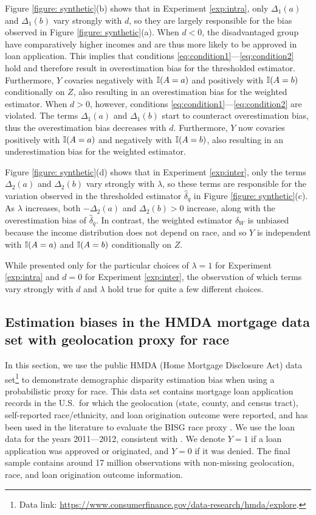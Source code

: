 Figure \ref{figure: synthetic}(b) shows that in Experiment \ref{exp:intra}, only $\Delta_1\!(a)$ and $\Delta_1\!(b)$ vary strongly with $d$, so they are largely responsible for the bias observed in Figure \ref{figure: synthetic}(a).
When $d < 0$, the disadvantaged group have comparatively higher incomes and are thus more likely to be approved in loan application.
This implies that conditions \eqref{eq:condition1}---\eqref{eq:condition2} hold and therefore result in overestimation bias for the thresholded estimator.
Furthermore, $Y$ covaries negatively with $\mathbb{I}(A=a)$ and positively with $\mathbb{I}(A=b)$ conditionally on $Z$, also resulting in an overestimation bias for the weighted estimator.
When $d > 0$, however, conditions \eqref{eq:condition1}---\eqref{eq:condition2} are violated.
The terms $\Delta_1(a)$ and $\Delta_1(b)$ start to counteract overestimation bias, thus the overestimation bias decreases with $d$.
Furthermore, $Y$ now covaries positively with $\mathbb{I}(A=a)$ and negatively with $\mathbb{I}(A=b)$, also resulting in an underestimation bias for the weighted estimator.

Figure \ref{figure: synthetic}(d) shows that in Experiment \ref{exp:inter}, only the terms $\Delta_2(a)$ and $\Delta_2(b)$ vary strongly with $\lambda$, so these terms are responsible for the variation observed in the thresholded estimator $\hat\delta_q$ in Figure \ref{figure: synthetic}(c).
As $\lambda$ increases, both $-\Delta_2(a)$ and $\Delta_2(b) > 0$ increase, along with the overestimation bias of $\hat\delta_q$.
In contrast, the weighted estimator $\hat\delta_W$ is unbiased because the income distribution does not depend on race, and so $Y$ is independent with $\mathbb{I}(A = a)$ and $\mathbb{I}(A=b)$ conditionally on $Z$.

While presented only for the particular choices of $\lambda=1$ for Experiment \ref{exp:intra} and $d=0$ for Experiment \ref{exp:inter}, the observation of which terms vary strongly with $d$ and $\lambda$ hold true for quite a few different choices.


\subsection{Estimation biases in the HMDA mortgage data set with geolocation proxy for race}
\label{sec:mortgage}

In this section, we use the public HMDA (Home Mortgage Disclosure Act) data set\footnote{Data link: \url{https://www.consumerfinance.gov/data-research/hmda/explore}.} to demonstrate demographic disparity estimation bias when using a probabilistic proxy for race.
This data set contains mortgage loan application records in the U.S.\ for which the geolocation (state, county, and census tract), self-reported race/\-ethnicity, and loan origination outcome were reported, and
has been used in the literature to evaluate the BISG race proxy \cite{Baines:2014aa, CFPB:proxy2014, zhang2016assessing}.
We use the loan data for the years 2011---2012, consistent with \cite{CFPB:proxy2014}.
We denote ${Y} = 1$ if a loan application was approved or originated, and ${Y} = 0$ if it was denied. The final sample contains around 17 million observations with non-missing geolocation, race, and loan origination outcome information.

